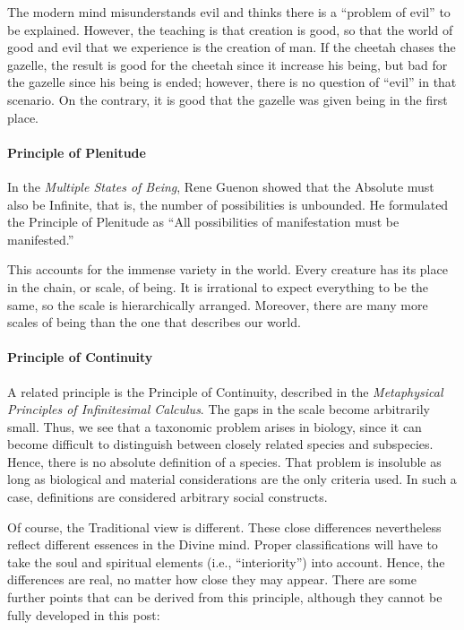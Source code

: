 The modern mind misunderstands evil and thinks there is a “problem of evil” to be explained. However, the teaching is that creation is good, so that the world of good and evil that we experience is the creation of man. If the cheetah chases the gazelle, the result is good for the cheetah since it increase his being, but bad for the gazelle since his being is ended; however, there is no question of “evil” in that scenario. On the contrary, it is good that the gazelle was given being in the first place.

\paragraph{Principle of Plenitude}
In the \emph{Multiple States of Being}, Rene Guenon showed that the Absolute must also be Infinite, that is, the number of possibilities is unbounded. He formulated the Principle of Plenitude as “All possibilities of manifestation must be manifested.”

This accounts for the immense variety in the world. Every creature has its place in the chain, or scale, of being. It is irrational to expect everything to be the same, so the scale is hierarchically arranged. Moreover, there are many more scales of being than the one that describes our world.

\paragraph{Principle of Continuity}
A related principle is the Principle of Continuity, described in the \emph{Metaphysical Principles of Infinitesimal Calculus}. The gaps in the scale become arbitrarily small. Thus, we see that a taxonomic problem arises in biology, since it can become difficult to distinguish between closely related species and subspecies. Hence, there is no absolute definition of a species. That problem is insoluble as long as biological and material considerations are the only criteria used. In such a case, definitions are considered arbitrary social constructs.

Of course, the Traditional view is different. These close differences nevertheless reflect different essences in the Divine mind. Proper classifications will have to take the soul and spiritual elements (i.e., “interiority”) into account. Hence, the differences are real, no matter how close they may appear. There are some further points that can be derived from this principle, although they cannot be fully developed in this post:

